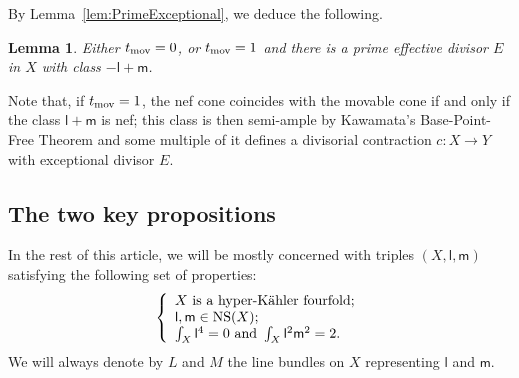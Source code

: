 \documentclass[12pt]{amsart}
\DeclareMathOperator{\NS}{NS}
\def\hk{hyper-K\"ahler}
\newtheorem{lemm}{Lemma}[section]
\theoremstyle{remark}
\def\lll{\ensuremath{\mathsf l}}
\def\mm{\ensuremath{\mathsf m}}
\begin{document}

By Lemma~\ref{lem:PrimeExceptional}, we deduce  the following.

\begin{lemm}\label{lem61}
Either $t_{\textnormal{mov}}=0$, or $t_{\textnormal{mov}}=1$ and there is a prime effective divisor $E$ in $X$ with class $-\lll+\mm$.
\end{lemm}

Note that, if $t_{\textnormal{mov}}=1$, the nef cone coincides with the movable cone if and only if the class $\lll+\mm$ is nef; this class is then semi-ample by Kawamata's Base-Point-Free Theorem and some multiple of it defines a divisorial contraction $c\colon X\to Y$ with exceptional divisor $E$.


\subsection{The two key propositions}\label{subsec:HKNefCone}

In the rest of this article, we will be mostly concerned with triples $(X,\lll,\mm)$ satisfying the following set of properties:
\begin{equation}\label{hypo}
    \left\{
    \begin{array}{l}
    X \hbox{ is a  \hk\ fourfold;}\\
   \lll, \mm\in \NS(X);\\
   \int_X \lll^{4}=0 \hbox { and }\int_X \lll^{2}\mm^{2}=2.
    \end{array}
    \right.
\end{equation}
We will always denote by $L$ and $M$ the line bundles on $X$ representing $\lll$ and $\mm$.
\end{document}
